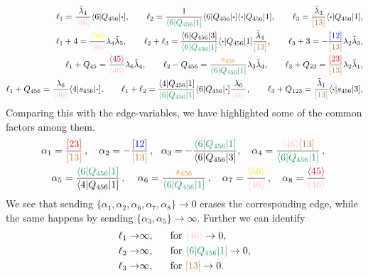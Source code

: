 \documentclass[letter,11pt]{article}
\newcommand{\red}[1]{\textcolor{red}{#1}}
\newcommand{\pink}[1]{\textcolor{pink}{#1}}
\newcommand{\blue}[1]{\textcolor{blue}{#1}}
\newcommand{\green}[1]{\textcolor{ForestGreen}{#1}}
\newcommand{\orange}[1]{\textcolor{orange}{#1}}
\newcommand{\brown}[1]{\textcolor{brown}{#1}}
\newcommand{\ab}[1]{\langle #1 \rangle}
\newcommand{\sqb}[1]{[ #1 ]}
\newcommand{\aMs}[3]{\langle #1|#2|#3]}  		%
\newcommand{\sab}[1]{s_{#1}}
\begin{document}
\begin{equation}
	\begin{aligned}
		\ell_1=\frac{\tilde\lambda_4}{\pink{\ab{46}}}\aMs{6}{Q_{456}}{\bm\cdot},~~~~~~\ell_2=\frac{1}{\green{\aMs{6 }{Q_{456}}{1}}}\aMs{6 }{Q_{456}}{\bm\cdot}\aMs{\bm \cdot }{Q_{456}}{1},~~~~~~	\ell_3=\frac{\tilde\lambda_3}{\brown{\sqb{13}}}\aMs{\bm\cdot}{Q_{456}}{1},\\
		\ell_1+4=\frac{\textcolor{yellow}{\ab{56}}}{\pink{\ab{46}}}\lambda_4\tilde{\lambda}_5,~~~~~~\ell_2+\ell_3=\frac{\aMs{6 }{Q_{456}}{3}}{\green{\aMs{6 }{Q_{456}}{1}}}\aMs{\bm \cdot }{Q_{456}}{1}\frac{\tilde\lambda_4}{\brown{\sqb{13}}},~~~~~~\ell_3+3=-\frac{\blue{\sqb{12}}}{\brown{\sqb{13}}}\lambda_2\tilde{\lambda}_3,
		\\
		\ell_1+Q_{45}=\frac{\textcolor{purple}{\ab{45}}}{\pink{\ab{46}}}\lambda_6\tilde{\lambda}_4,~~~~~~\ell_2-Q_{456}=\frac{\orange{s_{456}}}{\green{\aMs{6 }{Q_{456}}{1}}}\lambda_3\tilde\lambda_4,~~~~~~\ell_3+Q_{23}=\frac{\red{\sqb{23}}}{\brown{\sqb{13}}}\lambda_2\tilde{\lambda}_1,\\
		\ell_1+Q_{456}=\frac{\lambda_6}{\pink{\ab{46}}}\aMs{4}{s_{456}}{\bm \cdot},~~~~~~\ell_1+\ell_2=\frac{\aMs{4 }{Q_{456}}{1}}{\green{\aMs{6 }{Q_{456}}{1}}}\aMs{6 }{Q_{456}}{\bm \cdot}\frac{\lambda_6}{\pink{\ab{46}}},~~~~~~\ell_3+Q_{123}=\frac{\tilde\lambda_1}{\brown{\sqb{13}}}\aMs{\bm\cdot}{s_{456}}{3},
	\end{aligned}
\end{equation}
Comparing this with the edge-variables, we have highlighted some of the common factors among them. 
\begin{align*}
	\alpha_1 = \frac{\red{[23]}}{\brown{[13]}}\,, \quad \alpha_2 = -\frac{\blue{[12]}}{\brown{[13]}}&\,,~~
	\alpha_3 = - \frac{\green{\aMs{6}{Q_{456}}{1}}}{\aMs{6}{Q_{456}}{3}}, \quad
	\alpha_4 =  \frac{\pink{\ab{46}}\brown{[13]}}{\green{\aMs{6}{Q_{456}}{1}}}\,,\\
	\alpha_5 = \frac{\green{\aMs{6}{Q_{456}}{1}}}{\aMs{4}{Q_{456}}{1}}\,,\quad
	\,\alpha_6 &= \frac{\orange{\sab{456}}}{\green{\aMs{6}{Q_{456}}{1}}}\,, \quad \alpha_7 = \frac{\textcolor{yellow}{\ab{56}}}{\pink{\ab{46}}}\,, \quad
	\alpha_8 = \frac{\textcolor{purple}{\ab{45}}}{\pink{\ab{46}}}\,  
\end{align*}
We see that sending $\{\alpha_1,\alpha_2,\alpha_6,\alpha_7,\alpha_8\}\to 0$ erases the corresponding edge, while the same happens by sending $\{\alpha_3,\alpha_5\}\to \infty$.
Further we can identify
\begin{equation}
	\begin{aligned}
		\ell_1\to& \infty,~~~~\text{ for }\pink{ \ab{46}}\to 0,\\
		\ell_2\to& \infty,~~~~\text{ for } \green{\aMs{6}{Q_{456}}{1}}\to 0,\\
		\ell_3\to& \infty,~~~~\text{ for } \brown{\sqb{13}}\to 0.\\
	\end{aligned}
\end{equation}
\end{document}
